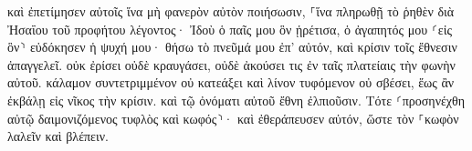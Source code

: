 \documentclass{openreader}
\begin{document}
καὶ ἐπετίμησεν αὐτοῖς ἵνα μὴ φανερὸν αὐτὸν ποιήσωσιν, 
⸀ἵνα πληρωθῇ τὸ ῥηθὲν διὰ Ἠσαΐου τοῦ προφήτου λέγοντος· 
Ἰδοὺ ὁ παῖς μου ὃν ᾑρέτισα, ὁ ἀγαπητός μου ⸂εἰς ὃν⸃ εὐδόκησεν ἡ ψυχή μου· θήσω τὸ πνεῦμά μου ἐπ’ αὐτόν, καὶ κρίσιν τοῖς ἔθνεσιν ἀπαγγελεῖ. 
οὐκ ἐρίσει οὐδὲ κραυγάσει, οὐδὲ ἀκούσει τις ἐν ταῖς πλατείαις τὴν φωνὴν αὐτοῦ. 
κάλαμον συντετριμμένον οὐ κατεάξει καὶ λίνον τυφόμενον οὐ σβέσει, ἕως ἂν ἐκβάλῃ εἰς νῖκος τὴν κρίσιν. 
καὶ τῷ ὀνόματι αὐτοῦ ἔθνη ἐλπιοῦσιν. 
Τότε ⸂προσηνέχθη αὐτῷ δαιμονιζόμενος τυφλὸς καὶ κωφός⸃· καὶ ἐθεράπευσεν αὐτόν, ὥστε τὸν ⸀κωφὸν λαλεῖν καὶ βλέπειν. 
\end{document}

